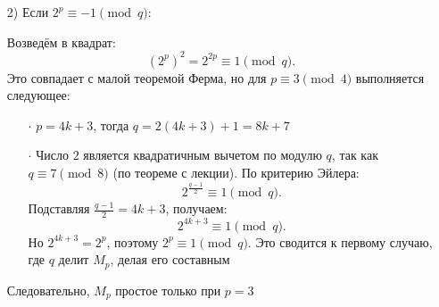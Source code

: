 \documentclass[a4paper]{article}
\begin{document}
\begin{enumerate}
\begin{enumerate}
        \item[2)]Если \( 2^p \equiv -1 \pmod{q} \):
        \item[] 
        Возведём в квадрат:  
        \[
        (2^p)^2 = 2^{2p} \equiv 1 \pmod{q}.
        \]  
        Это совпадает с малой теоремой Ферма, но для \( p \equiv 3 \pmod{4} \) выполняется следующее: 
        \begin{enumerate}
            \item[$\cdot$]\( p = 4k + 3 \), тогда \( q = 2(4k + 3) + 1 = 8k + 7 \)
            \item[$\cdot$] Число \( 2 \) является квадратичным вычетом по модулю \( q \), так как \( q \equiv 7 \pmod{8} \) (по теореме с лекции). 
            По критерию Эйлера:  
            \[
            2^{\frac{q-1}{2}} \equiv 1 \pmod{q}.
            \]  
            Подставляя \( \frac{q-1}{2} = 4k + 3 \), получаем:  
            \[
            2^{4k + 3} \equiv 1 \pmod{q}.
            \]  
            Но \( 2^{4k + 3} = 2^p \), поэтому \( 2^p \equiv 1 \pmod{q} \).  
            Это сводится к первому случаю, где \( q \) делит \( M_p \), делая его составным    
        \end{enumerate}

        Следовательно, $M_p$ простое только при $p = 3$
    \end{enumerate}
\end{enumerate}
\end{document}
